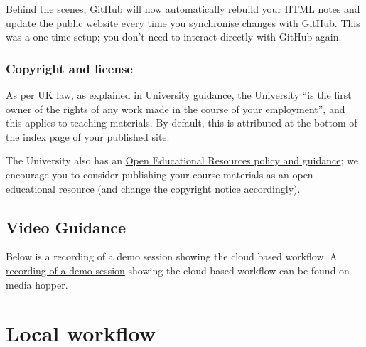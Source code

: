 Behind the scenes, GitHub will now automatically rebuild your HTML notes and update the public website every time you synchronise changes with GitHub. This was a one-time setup; you don't need to interact directly with GitHub again.

\subsubsection*{Copyright and license}
\label{ssec:pub:license}

As per UK law, as explained in \href{https://library.ed.ac.uk/library-help/copyright/copyright-teaching}{University guidance}, the University ``is the first owner of the rights of any work made in the course of your employment'', and this applies to teaching materials. By default, this is attributed at the bottom of the index page of your published site.

The University also has an \href{https://open.ed.ac.uk/how-to-guides/}{Open Educational Resources policy and guidance}; we encourage you to consider publishing your course materials as an open educational resource (and change the copyright notice accordingly).


\subsection{Video Guidance}
\iflatexml
Below is a recording of a demo session showing the cloud based workflow. 
\else
A \href{https://media.ed.ac.uk/media/BookML+LaTeX+to+HTML+Demo+%28recording%29/1_zypgaqqb}{recording of a demo session}
showing the cloud based workflow can be found on media hopper.
\fi


\section{Local workflow}

